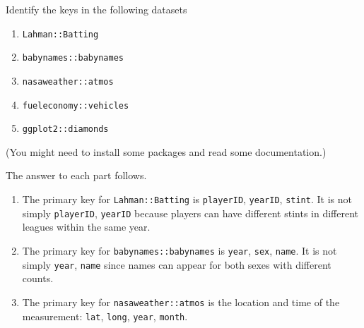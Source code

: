 \documentclass[]{book}
\newenvironment{Shaded}{\begin{snugshade}}{\end{snugshade}}
\newcommand{\CommentTok}[1]{\textcolor[rgb]{0.56,0.35,0.01}{\textit{#1}}}
\newcommand{\DecValTok}[1]{\textcolor[rgb]{0.00,0.00,0.81}{#1}}
\newcommand{\KeywordTok}[1]{\textcolor[rgb]{0.13,0.29,0.53}{\textbf{#1}}}
\newcommand{\NormalTok}[1]{#1}
\newcommand{\OperatorTok}[1]{\textcolor[rgb]{0.81,0.36,0.00}{\textbf{#1}}}
\newcommand{\StringTok}[1]{\textcolor[rgb]{0.31,0.60,0.02}{#1}}
\providecommand{\tightlist}{%
  \setlength{\itemsep}{0pt}\setlength{\parskip}{0pt}}
\theoremstyle{plain}
\theoremstyle{remark}
\begin{document}
Identify the keys in the following datasets

\begin{enumerate}
\def\labelenumi{\arabic{enumi}.}
\tightlist
\item
  \texttt{Lahman::Batting}
\item
  \texttt{babynames::babynames}
\item
  \texttt{nasaweather::atmos}
\item
  \texttt{fueleconomy::vehicles}
\item
  \texttt{ggplot2::diamonds}
\end{enumerate}

(You might need to install some packages and read some documentation.)

The answer to each part follows.

\begin{enumerate}
\def\labelenumi{\arabic{enumi}.}
\item
  The primary key for \texttt{Lahman::Batting} is \texttt{playerID},
  \texttt{yearID}, \texttt{stint}. It is not simply \texttt{playerID},
  \texttt{yearID} because players can have different stints in different
  leagues within the same year.

\begin{Shaded}
\end{Shaded}
\item
  The primary key for \texttt{babynames::babynames} is \texttt{year},
  \texttt{sex}, \texttt{name}. It is not simply \texttt{year},
  \texttt{name} since names can appear for both sexes with different
  counts.

\begin{Shaded}
\end{Shaded}
\item
  The primary key for \texttt{nasaweather::atmos} is the location and
  time of the measurement: \texttt{lat}, \texttt{long}, \texttt{year},
  \texttt{month}.


\end{enumerate}
\end{document}
